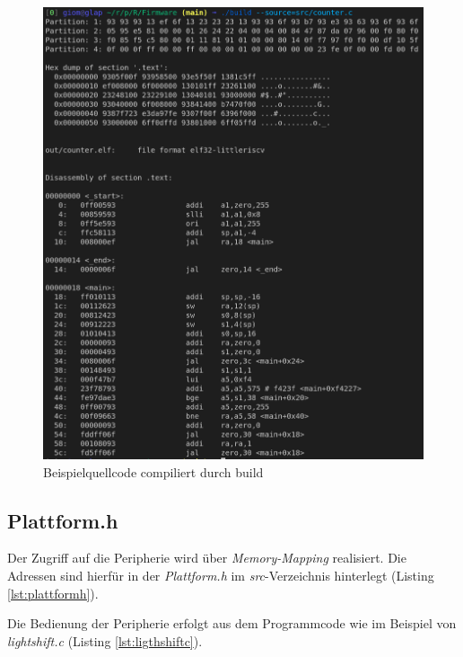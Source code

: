         \begin{figure}[H]
            \centering
            \includegraphics[scale=1]{img/build_example.png}
            \caption{Beispielquellcode compiliert durch build}
            \label{fig:build-example}
        \end{figure}

        \subsection{Plattform.h}
            Der Zugriff auf die Peripherie wird über \textit{Memory-Mapping} realisiert.
            Die Adressen sind hierfür in der \textit{Plattform.h} im \textit{src}-Verzeichnis
            hinterlegt (Listing \ref{lst:plattformh}).
            
            Die Bedienung der Peripherie erfolgt aus dem Programmcode wie im Beispiel von \textit{lightshift.c} (Listing \ref{lst:ligthshiftc}).
            

